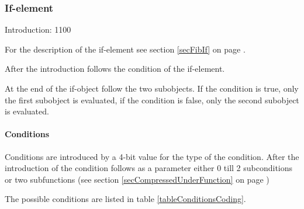 

\subsubsection{If-element}

Introduction: 1100

\bigskip\noindent
For the description of the if-element see section \ref{secFibIf} on page \pageref{secFibIf} .

After the introduction follows the condition of the if-element.

At the end of the if-object follow the two subobjects. If the condition is true, only the first subobject is evaluated, if the condition is false, only the second subobject is evaluated.


\paragraph{Conditions}

Conditions are introduced by a 4-bit value for the type of the condition. After the introduction of the condition follows as a parameter either 0 till 2 subconditions or two subfunctions (see section \ref{secCompressedUnderFunction} on page \pageref{secCompressedUnderFunction})

The possible conditions are listed in table \ref{tableConditionsCoding}.

